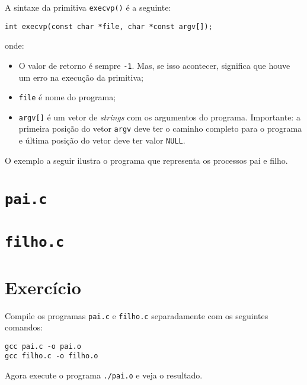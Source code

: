 A sintaxe da primitiva \texttt{execvp()} é a seguinte:

\begin{lstlisting}[style=MyCStyle, frame=none]
int execvp(const char *file, char *const argv[]);
\end{lstlisting}
 
onde: 
\begin{itemize}
    \item O valor de retorno é sempre \texttt{-1}. Mas, se isso acontecer, significa que houve um erro na execução da primitiva;
    \item \texttt{file} é nome do programa;
    \item \texttt{argv[]} é um vetor de \textit{strings} com os argumentos do programa. Importante: a primeira posição do vetor \texttt{argv} deve ter o caminho completo para o programa e última posição do vetor deve ter valor \texttt{NULL}.
 \end{itemize}
 
 O exemplo a seguir ilustra o programa que representa os processos pai e filho. 
 \newpage
 
 \section*{\texttt{pai.c}}
 
 
 \section*{\texttt{filho.c}}
 
 
 \section{Exercício}
 Compile os programas \texttt{pai.c} e \texttt{filho.c} separadamente com os seguintes comandos:

\begin{lstlisting}[style=MyBashStyle]
gcc pai.c -o pai.o
gcc filho.c -o filho.o
\end{lstlisting}


Agora execute o programa \texttt{./pai.o} e veja o resultado.